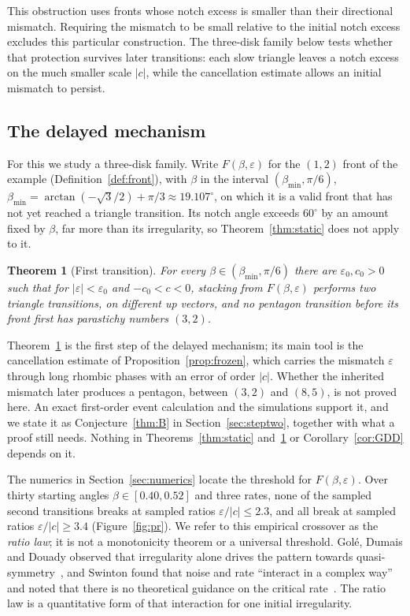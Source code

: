 \documentclass[11pt]{amsart}
\newtheorem{theorem}{Theorem}
\theoremstyle{definition}
\newcommand{\eps}{\varepsilon}
\begin{document}
\noindent This obstruction uses fronts whose notch excess is smaller than their directional mismatch.
Requiring the mismatch to be small relative to the initial notch excess excludes this particular
construction. The three-disk family below tests whether that protection survives later
transitions: each slow triangle leaves a notch excess on the much smaller scale $|c|$, while the
cancellation estimate allows an initial mismatch to persist.

\subsection*{The delayed mechanism} For this we study a three-disk family. Write $F(\beta,\eps)$ for the $(1,2)$ front of the example
(Definition~\ref{def:front}), with $\beta$ in the interval $(\beta_{\min},\pi/6)$,
$\beta_{\min}=\arctan(-\sqrt3/2)+\pi/3\approx19.107^\circ$, on which it is a valid front that has not yet
reached a triangle transition. Its notch angle exceeds $60^\circ$ by an amount fixed by $\beta$, far more
than its irregularity, so Theorem~\ref{thm:static} does not apply to it.

\begin{theorem}[First transition]\label{thm:A}
For every $\beta\in(\beta_{\min},\pi/6)$ there are $\eps_0,c_0>0$ such that for $|\eps|<\eps_0$ and
$-c_0<c<0$, stacking from $F(\beta,\eps)$ performs two triangle transitions, on different up
vectors, and no pentagon transition before its front first has parastichy numbers $(3,2)$.
\end{theorem}

\noindent Theorem~\ref{thm:A} is the first step of the delayed mechanism; its main tool is the
cancellation estimate of Proposition~\ref{prop:frozen}, which carries the mismatch $\eps$ through
long rhombic phases with an error of order $|c|$. Whether the inherited mismatch later produces a
pentagon, between $(3,2)$ and $(8,5)$, is not proved here. An exact first-order event calculation and
the simulations support it, and we state it as Conjecture~\ref{thm:B} in Section~\ref{sec:steptwo},
together with what a proof still needs. Nothing in Theorems~\ref{thm:static} and~\ref{thm:A} or
Corollary~\ref{cor:GDD} depends on it.

The numerics in Section~\ref{sec:numerics} locate the threshold for $F(\beta,\eps)$. Over thirty starting
angles $\beta\in[0.40,0.52]$ and three rates, none of the sampled second transitions breaks at sampled ratios $\eps/|c|\le2.3$, and
all break at sampled ratios $\eps/|c|\ge3.4$ (Figure~\ref{fig:pr}). We refer to this empirical crossover as the
\emph{ratio law}; it is not a monotonicity theorem or a universal threshold. Gol\'e, Dumais and Douady observed that irregularity alone drives the pattern towards
quasi-symmetry~\cite[p.~29, item (iii)]{GDD}, and Swinton found that noise and rate ``interact in a complex
way''~\cite[Sec.~5.3]{Swinton2024} and noted that there is no theoretical guidance on the critical
rate~\cite[Sec.~6]{Swinton2024}. The ratio law is a quantitative form
of that interaction for one initial irregularity.
\end{document}
